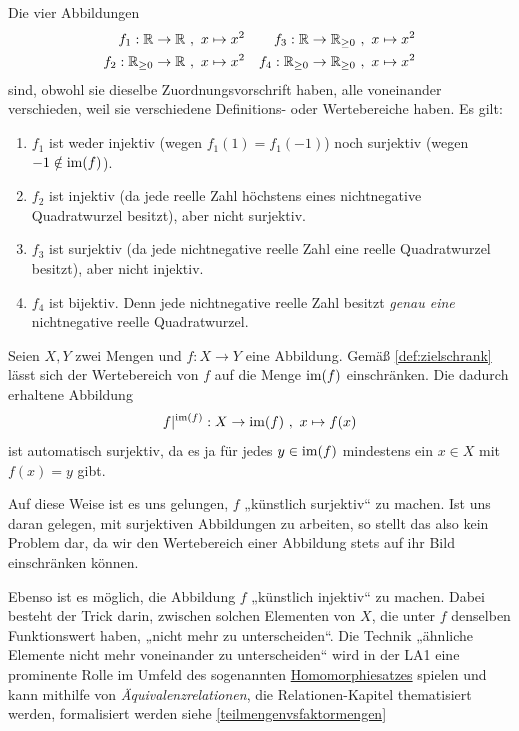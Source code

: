 \begin{bsp} \label{bsp:injsur}
    Die vier Abbildungen
    \begin{align*}
        f_1 : \mathbb R \to \mathbb R \ &,\ x\mapsto x^2 & f_3 :\mathbb R\to \mathbb R_{\ge 0} \ &,\ x\mapsto x^2 \\
        f_2 : \mathbb R_{\ge 0} \to \mathbb R \ &,\ x\mapsto x^2 & f_4 :\mathbb R_{\ge 0} \to \mathbb R_{\ge 0} \ &,\ x\mapsto x^2
    \end{align*}
    sind, obwohl sie dieselbe Zuordnungsvorschrift haben, alle voneinander verschieden, weil sie verschiedene Definitions- oder Wertebereiche haben. Es gilt:
    \begin{enumerate}
        \item $f_1$ ist weder injektiv (wegen $f_1(1)=f_1(-1)$) noch surjektiv (wegen $-1\notin \operatorname{im}(f)$).
        \item $f_2$ ist injektiv (da jede reelle Zahl höchstens eines nichtnegative Quadratwurzel besitzt), aber nicht surjektiv.
        \item $f_3$ ist surjektiv (da jede nichtnegative reelle Zahl eine reelle Quadratwurzel besitzt), aber nicht injektiv.
        \item $f_4$ ist bijektiv. Denn jede nichtnegative reelle Zahl besitzt \emph{genau eine} nichtnegative reelle Quadratwurzel.
    \end{enumerate}
\end{bsp}


\begin{vorschau} \label{surjektivmachen}
    Seien $X,Y$ zwei Mengen und $f:X\to Y$ eine Abbildung. Gemäß \cref{def:zielschrank} lässt sich der Wertebereich von $f$ auf die Menge $\operatorname{im}(f)$ einschränken. Die dadurch erhaltene Abbildung
        \[ f\vert^{\operatorname{im}(f)} : X \to \operatorname{im}(f) \ ,\ x\mapsto f(x) \]
    ist automatisch surjektiv, da es ja für jedes $y\in \operatorname{im}(f)$ mindestens ein $x\in X$ mit $f(x)=y$ gibt.

    Auf diese Weise ist es uns gelungen, $f$ „künstlich surjektiv“ zu machen. Ist uns daran gelegen, mit surjektiven Abbildungen zu arbeiten, so stellt das also kein Problem dar, da wir den Wertebereich einer Abbildung stets auf ihr Bild einschränken können.

    Ebenso ist es möglich, die Abbildung $f$ „künstlich injektiv“ zu machen. Dabei besteht der Trick darin, zwischen solchen Elementen von $X$, die unter $f$ denselben Funktionswert haben, „nicht mehr zu unterscheiden“. Die Technik „ähnliche Elemente nicht mehr voneinander zu unterscheiden“ wird in der LA1 eine prominente Rolle im Umfeld des sogenannten \href{https://de.wikipedia.org/wiki/Homomorphiesatz}{Homomorphiesatzes} spielen und kann mithilfe von \emph{Äquivalenzrelationen}, die Relationen-Kapitel thematisiert werden, formalisiert werden siehe \cref{teilmengenvsfaktormengen}
\end{vorschau}





